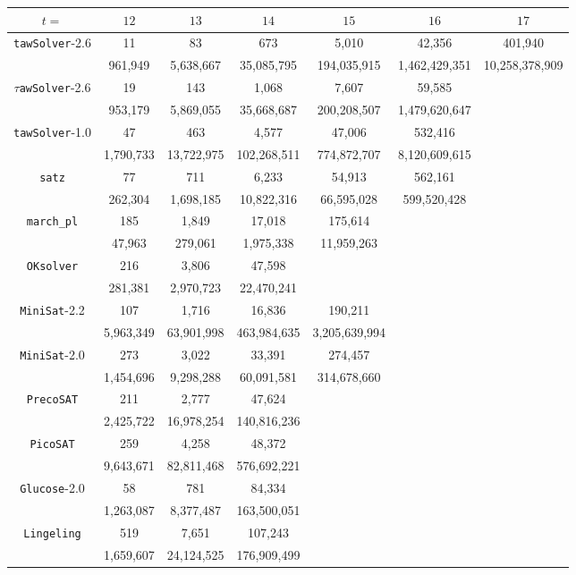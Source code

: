 \documentclass[final,3p,times]{elsarticle}
\theoremstyle{definition}
\newcommand{\tawsolver}{\texttt{tawSolver}}
\newcommand{\otawsolver}{\tawsolver-1.0}
\newcommand{\ntawsolver}{\tawsolver-2.6}
\newcommand{\ttawsolver}{$\tau$\texttt{awSolver}-2.6}
\newcommand{\oksolver}{\texttt{OKsolver}}
\newcommand{\satz}{\texttt{satz}}
\newcommand{\march}{\texttt{march\_pl}}
\newcommand{\minisat}{\texttt{MiniSat}}
\newcommand{\glucose}{\texttt{Glucose}}
\newcommand{\picosat}{\texttt{PicoSAT}}
\newcommand{\precosat}{\texttt{PrecoSAT}}
\newcommand{\lingeling}{\texttt{Lingeling}}
\begin{document}
\begin{table}[H]
  \centering
  \begin{tabular}{c||c|c|c|c|c|c}
    $t=$ & $12$ & $13$ & $14$ & $15$ & $16$ & $17$\\
    \hline\hline
    \ntawsolver & 11 & 83 & 673 & 5,010 & 42,356 & 401,940\\
    & 961,949 & 5,638,667 & 35,085,795 & 194,035,915 & 1,462,429,351 & 10,258,378,909\\
    \hline
    \ttawsolver & 19 & 143 & 1,068 & 7,607 & 59,585\\
    & 953,179 & 5,869,055 & 35,668,687 & 200,208,507 & 1,479,620,647\\
    \hline
    \otawsolver & 47 & 463 & 4,577 & 47,006 & 532,416 \\
    & 1,790,733 & 13,722,975 & 102,268,511 & 774,872,707 & 8,120,609,615\\
    \hline
    \satz{} & 77 & 711 & 6,233 & 54,913 & 562,161\\
    & 262,304 & 1,698,185 & 10,822,316 & 66,595,028 & 599,520,428\\
    \hline
    \march & 185 & 1,849 & 17,018 & 175,614\\
    & 47,963 & 279,061 & 1,975,338 & 11,959,263 \\
    \hline
    \oksolver & 216 & 3,806 & 47,598\\
    & 281,381 & 2,970,723 & 22,470,241\\
    \hline\hline
    \minisat-2.2 & 107 & 1,716 & 16,836 & 190,211\\
    & 5,963,349 & 63,901,998 & 463,984,635 & 3,205,639,994\\
    \hline
    \minisat-2.0 & 273 & 3,022 & 33,391 & 274,457\\
    & 1,454,696 & 9,298,288 & 60,091,581 & 314,678,660\\
    \hline
    \precosat & 211 & 2,777 & 47,624\\
    & 2,425,722 & 16,978,254 & 140,816,236\\
    \hline
    \picosat & 259 & 4,258 & 48,372\\
    & 9,643,671 & 82,811,468 & 576,692,221\\
    \hline
    \glucose-2.0 & 58 & 781 & 84,334\\
    & 1,263,087 & 8,377,487 & 163,500,051\\
    \hline
    \lingeling & 519 & 7,651 & 107,243\\
    & 1,659,607 & 24,124,525 & 176,909,499\\

\end{tabular}
\end{table}
\end{document}
